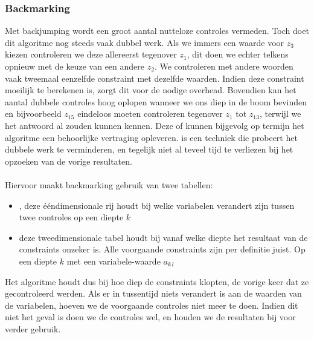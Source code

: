 \subsubsection{Backmarking}
Met backjumping wordt een groot aantal nutteloze controles vermeden. Toch doet dit algoritme nog steeds vaak dubbel werk. Als we immers een waarde voor $z_3$ kiezen controleren we deze allereerst tegenover $z_1$, dit doen we echter telkens opnieuw met de keuze van een andere $z_2$. We controleren met andere woorden vaak tweemaal eenzelfde constraint met dezelfde waarden. Indien deze constraint moeilijk te berekenen is, zorgt dit voor de nodige overhead. Bovendien kan het aantal dubbele controles hoog oplopen wanneer we ons diep in de boom bevinden en bijvoorbeeld $z_{15}$ eindeloos moeten controleren tegenover $z_1$ tot $z_{13}$, terwijl we het antwoord al zouden kunnen kennen. Deze  of  kunnen bijgevolg op termijn het algoritme een behoorlijke vertraging opleveren.  is een techniek die probeert het dubbele werk te verminderen, en tegelijk niet al teveel tijd te verliezen bij het opzoeken van de vorige resultaten.
\paragraph{}
Hiervoor maakt backmarking gebruik van twee tabellen:
\begin{itemize}
 \item {}, deze \'e\'endimensionale rij houdt bij welke variabelen verandert zijn tussen twee controles op een diepte $k$
 \item {} deze tweedimensionale tabel houdt bij vanaf welke diepte het resultaat van de constraints onzeker is. Alle voorgaande constraints zijn per definitie juist. Op een diepte $k$ met een variabele-waarde $a_{k\,l}$
\end{itemize}
Het algoritme houdt dus bij hoe diep de constraints klopten, de vorige keer dat ze gecontroleerd werden. Als er in tussentijd niets verandert is aan de waarden van de variabelen, hoeven we de voorgaande controles niet meer te doen. Indien dit niet het geval is doen we de controles wel, en houden we de resultaten bij voor verder gebruik.
